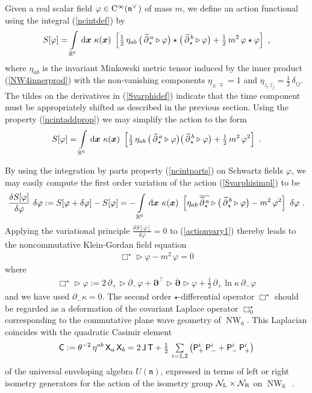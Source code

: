 \documentclass[11pt,a4paper]{article}
\DeclareMathOperator{\NW}{NW}
\newcommand{\1}{\mathbb{1}}
\newcommand{\mbf}[1]{{\boldsymbol {#1} }}
\def\dd{{\rm d}}
\def\CC{{\rm C}}
\def\P{{\sf P}}
\def\T{{\sf T}}
\def\X{{\sf X}}
\def\J{{\sf J}}
\def\mdell{{\mbf\partial}}
\def\mfn{{\mathfrak n}}
\newcommand{\R}{\real}
\newcommand{\real}{{\mathbb R}} %
\newcommand{\beq}{\begin{eqnarray}}
\newcommand{\eeq}{\end{eqnarray}}
\begin{document}
Given a real scalar field $\varphi\in\CC^\infty(\mfn^{\vee\,})$ of mass $m$,
we define an action functional using the integral (\ref{ncintdef}) by
\beq
S[\varphi]=\int\limits_{\R^6}\,\dd\mbf x~\kappa(\mbf x)~\left[
\mbox{$\frac12$}\,\eta_{ab}\,\bigl(\,\widetilde
{\partial}{}^{\,a}_{\star}\triangleright\varphi\bigr)\star
\bigl(\,\widetilde{\partial}{}^{\,b}_{\star}\triangleright\varphi\bigr)+
\mbox{$\frac12$}\,m^2\,\varphi\star\varphi\right] \ ,
\label{Svarphidef}\eeq
where $\eta_{ab}$ is the invariant Minkowski metric tensor induced by
the inner product (\ref{NW4innerprod}) with the non-vanishing components
$\eta_{\pm\,\mp}=1$ and $\eta_{z_i\,\overline{z}_j}=\frac12\,\delta_{ij}$. The
tildes on the derivatives in (\ref{Svarphidef}) indicate that the time
component must be appropriately shifted as described in the previous
section. Using the property (\ref{ncintaddprop}) we may simplify the
action to the form
\beq
S[\varphi]=\int\limits_{\R^6}\,\dd\mbf x~\kappa(\mbf x)~\left[
\mbox{$\frac12$}\,\eta_{ab}\,\bigl(\,\widetilde
{\partial}{}^{\,a}_{\star}\triangleright\varphi\bigr)
\bigl(\,\widetilde{\partial}{}^{\,b}_{\star}\triangleright\varphi\bigr)+
\mbox{$\frac12$}\,m^2\,\varphi^2\right] \ .
\label{Svarphisimpl}\eeq

By using the integration by parts property (\ref{ncintparts}) on
Schwartz fields $\varphi$, we may easily compute the first order
variation of the action (\ref{Svarphisimpl}) to be
\beq
\frac{\delta S[\varphi]}{\delta\varphi}~\delta\varphi:=
S[\varphi+\delta\varphi]-S[\varphi]=-\int\limits_{\R^6}\,\dd\mbf x~
\kappa(\mbf x)~\left[\eta_{ab}\,\overline{\widetilde
{\partial}{}_\star^{\,a}}\triangleright\bigl(\,\widetilde
{\partial}{}_\star^{\,b}\triangleright\varphi\bigr)-m^2\,\varphi^2
\right]~\delta\varphi \ .
\label{actionvary1}\eeq
Applying the variational principle $\frac{\delta
  S[\varphi]}{\delta\varphi}=0$ to (\ref{actionvary1}) thereby leads
to the noncommutative Klein-Gordan field equation
\beq
\Box^\star\triangleright\varphi-m^2\,\varphi=0
\label{NCeom}\eeq
where
\beq
\Box^\star\triangleright\varphi:=2\,\partial_+\triangleright
\partial_-\varphi+\mdell^\top\triangleright
\overline{\mdell}\triangleright\varphi+\mbox{$\frac12$}\,
\partial_+\ln\kappa~\partial_-\varphi
\label{Boxstardef}\eeq
and we have used $\partial_-\kappa=0$. The second order
$\star$-differential operator $\Box^\star$ should be regarded as a deformation
of the covariant Laplace operator $\Box_0^\star$ corresponding to the
commutative plane wave geometry of $\NW_6$. This Laplacian coincides
with the quadratic Casimir element
\beq
{\sf C}:=\theta^{-2}\,\eta^{ab}\,\X_a\,\X_b
=2\,\J\,\T+\mbox{$\frac12\,\sum\limits_{i=1,2}$}\,\bigl(
\P_+^i\,\P_-^i+\P_-^i\,\P_+^i\bigr)
\label{quadCasimir}\eeq
of the universal enveloping algebra $U(\mfn)$, expressed in terms of
left or right isometry generators for the action of the isometry group
$\mathcal{N}_{\rm L}\times\mathcal{N}_{\rm R}$ on
$\NW_6$~\cite{PK1,CFS1,HSz1}.
\end{document}
